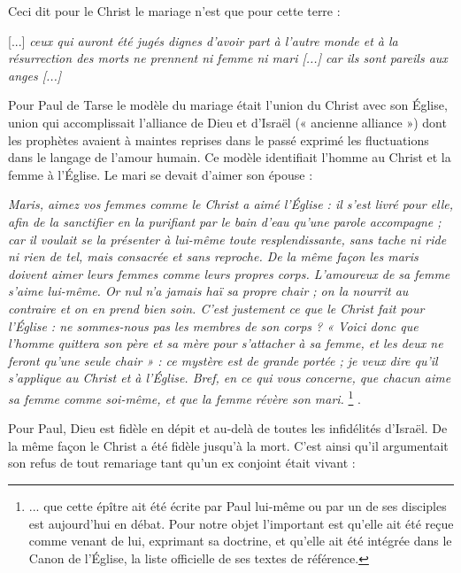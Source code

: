  Ceci dit pour le Christ le mariage n'est que pour cette terre :

\begin{displayquote}[Luc 20, 34-36]

[...] \emph{ceux qui auront été jugés dignes d'avoir part à l'autre monde et à la résurrection des morts ne prennent ni femme ni mari \emph{[...]} car ils sont pareils aux anges \emph{[...]}}
\end{displayquote}

 Pour Paul de Tarse le modèle du mariage était l'union du Christ avec son Église, union qui accomplissait l'alliance de Dieu et d'Israël (« ancienne alliance ») dont les prophètes avaient à maintes reprises dans le passé exprimé les fluctuations dans le langage de l'amour humain. Ce modèle identifiait l'homme au Christ et la femme à l'Église. Le mari se devait d'aimer son épouse :

\begin{displayquote}[Eph. 5,25-33]
\emph{Maris, aimez vos femmes comme le Christ a aimé l'Église : il s'est livré pour elle, afin de la sanctifier en la purifiant par le bain d'eau qu'une parole accompagne ; car il voulait se la présenter à lui-même toute resplendissante, sans tache ni ride ni rien de tel, mais consacrée et sans reproche. De la même façon les maris doivent aimer leurs femmes comme leurs propres corps. L'amoureux de sa femme s'aime lui-même. Or nul n'a jamais haï sa propre chair ; on la nourrit au contraire et on en prend bien soin. C'est justement ce que le Christ fait pour l'Église : ne sommes-nous pas les membres de son corps ? « Voici donc que l'homme quittera son père et sa mère pour s'attacher à sa femme, et les deux ne feront qu'une seule chair » : ce mystère est de grande portée ; je veux dire qu'il s'applique au Christ et à l'Église. Bref, en ce qui vous concerne, que chacun aime sa femme comme soi-même, et que la femme révère son mari.}%
\footnote{... que cette épître ait été écrite par Paul lui-même ou par un de ses disciples est aujourd'hui en débat. Pour notre objet l'important est qu'elle ait été reçue comme venant de lui, exprimant sa doctrine, et qu'elle ait été intégrée dans le Canon de l'Église, la liste officielle de ses textes de référence.}%
.
\end{displayquote}

 Pour Paul, Dieu est fidèle en dépit et au-delà de toutes les infidélités d'Israël. De la même façon le Christ a été fidèle jusqu'à la mort. C'est ainsi qu'il argumentait son refus de tout remariage tant qu'un ex conjoint était vivant :

